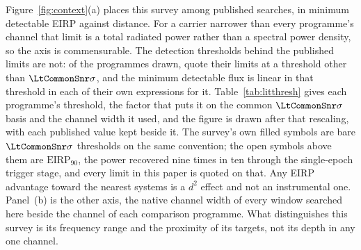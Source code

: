 Figure~\ref{fig:context}(a) places this survey among published searches,
in minimum detectable EIRP against distance. For a carrier narrower than
every programme's channel that limit is a total radiated power rather than
a spectral power density, so the axis is commensurable. The detection
thresholds behind the published limits are not: of the \LtNProg{}
programmes drawn, \LtNRescaled{} quote their limits at a threshold other
than $\LtCommonSnr\sigma$, and the minimum detectable flux is linear in
that threshold in each of their own expressions for it. Table~\ref{tab:litthresh}
gives each programme's threshold, the factor that puts it on the common
$\LtCommonSnr\sigma$ basis and the channel width it used, and the figure is
drawn after that rescaling, with each published value kept beside it. The
survey's own filled symbols are bare $\LtCommonSnr\sigma$ thresholds on the
same convention; the open symbols above them are $\mathrm{EIRP}_{90}$, the
power recovered nine times in ten through the single-epoch trigger stage,
and every limit in this paper is quoted on that. Any EIRP advantage toward
the nearest systems is a $d^{2}$ effect and not an instrumental one.
Panel~(b) is the other axis, the native channel width of every window
searched here beside the channel of each comparison programme. What
distinguishes this survey is its frequency range and the proximity of its
targets, not its depth in any one channel.

\begin{table}
\centering
\caption{The comparison programmes of Figure~\ref{fig:context}, each on its
own detection threshold and on the common $\LtCommonSnr\sigma$ basis.
$\mathrm{EIRP}_{\rm min}$ is the deepest limit each paper reports, and the
factor is $\LtCommonSnr/(\mathrm{S/N})$, the minimum detectable flux being
linear in the threshold in every one of their own expressions for it.}
\label{tab:litthresh}
\scriptsize
\setlength{\tabcolsep}{4pt}

\end{table}


